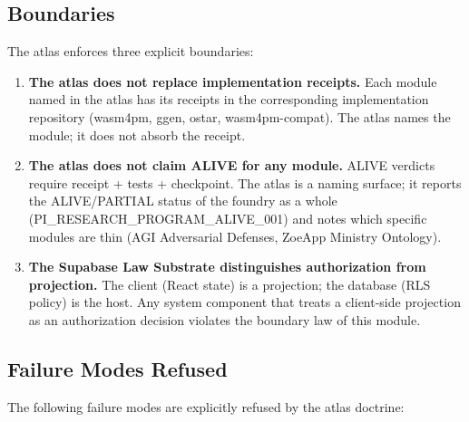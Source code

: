 \subsection{Boundaries}
\label{sec:atlas-arch-boundaries}

The atlas enforces three explicit boundaries:

\begin{enumerate}
  \item \textbf{The atlas does not replace implementation receipts.} Each module
        named in the atlas has its receipts in the corresponding implementation
        repository (wasm4pm, ggen, ostar, wasm4pm-compat). The atlas names the
        module; it does not absorb the receipt.

  \item \textbf{The atlas does not claim ALIVE for any module.} ALIVE verdicts
        require receipt + tests + checkpoint. The atlas is a naming surface; it
        reports the ALIVE/PARTIAL status of the foundry as a whole
        (PI\_RESEARCH\_PROGRAM\_ALIVE\_001) and notes which specific modules are
        thin (AGI Adversarial Defenses, ZoeApp Ministry Ontology).

  \item \textbf{The Supabase Law Substrate distinguishes authorization from
        projection.} The client (React state) is a projection; the database (RLS
        policy) is the host. Any system component that treats a client-side
        projection as an authorization decision violates the boundary law of this
        module.
\end{enumerate}

\subsection{Failure Modes Refused}
\label{sec:atlas-arch-failure}

The following failure modes are explicitly refused by the atlas doctrine:

